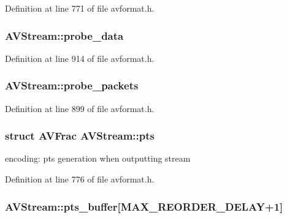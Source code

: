 Definition at line 771 of file avformat.\+h.

\subsubsection[{\texorpdfstring{probe\+\_\+data}{probe_data}}]{ A\+V\+Stream\+::probe\+\_\+data}\hypertarget{struct_a_v_stream_a9749c451ce3c41a2345933252c4f96c6}{}\label{struct_a_v_stream_a9749c451ce3c41a2345933252c4f96c6}


Definition at line 914 of file avformat.\+h.

\subsubsection[{\texorpdfstring{probe\+\_\+packets}{probe_packets}}]{ A\+V\+Stream\+::probe\+\_\+packets}\hypertarget{struct_a_v_stream_a1cd124860be31d0d275bb838ace6a98c}{}\label{struct_a_v_stream_a1cd124860be31d0d275bb838ace6a98c}


Definition at line 899 of file avformat.\+h.

\subsubsection[{\texorpdfstring{pts}{pts}}]{\setlength{\rightskip}{0pt plus 5cm}struct {\bf A\+V\+Frac} A\+V\+Stream\+::pts}\hypertarget{struct_a_v_stream_afb080896a72650bcb1e613cbb26ef09b}{}\label{struct_a_v_stream_afb080896a72650bcb1e613cbb26ef09b}
encoding\+: pts generation when outputting stream 

Definition at line 776 of file avformat.\+h.

\subsubsection[{\texorpdfstring{pts\+\_\+buffer}{pts_buffer}}]{ A\+V\+Stream\+::pts\+\_\+buffer\mbox{[}{\bf M\+A\+X\+\_\+\+R\+E\+O\+R\+D\+E\+R\+\_\+\+D\+E\+L\+AY}+1\mbox{]}}\hypertarget{struct_a_v_stream_ac13a11eddbc6618f2a7cb66b75f6eb68}{}\label{struct_a_v_stream_ac13a11eddbc6618f2a7cb66b75f6eb68}


